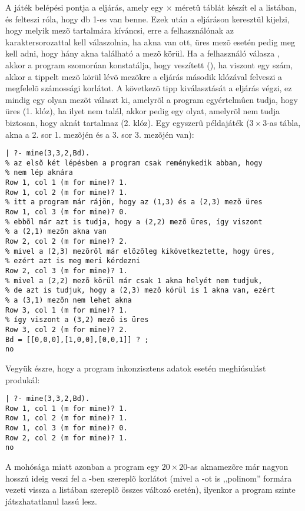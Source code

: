 A játék belépési pontja a  eljárás, amely
egy  $\times$  méretû táblát készít el a 
listában, és felteszi róla, hogy  db 1-es van benne.
Ezek után a  eljáráson keresztül kijelzi, hogy melyik
mezõ tartalmára kíváncsi, erre a felhasználónak az  karaktersorozattal
kell válaszolnia, ha akna van ott, üres mezõ esetén pedig meg kell adni, hogy
hány akna található a mezõ körül. Ha a felhasználó válasza , akkor a
program szomorúan konstatálja, hogy veszített (), ha viszont egy
szám, akkor a tippelt mezõ körül lévõ mezõkre a  eljárás
második klózával felveszi a megfelelõ számossági korlátot. A következõ tipp
kiválasztását a  eljárás végzi, ez mindig egy olyan mezõt
választ ki, amelyrõl a program egyértelmûen tudja, hogy üres (1. klóz), ha ilyet
nem talál, akkor pedig egy olyat, amelyrõl nem tudja biztosan, hogy aknát tartalmaz
(2. klóz). Egy egyszerû példajáték ($3 \times 3$-as tábla, akna a 2. sor 1. mezõjén
és a 3. sor 3. mezõjén van):

\begin{verbatim}
| ?- mine(3,3,2,Bd).
% az elsõ két lépésben a program csak reménykedik abban, hogy
% nem lép aknára
Row 1, col 1 (m for mine)? 1.
Row 1, col 2 (m for mine)? 1.
% itt a program már rájön, hogy az (1,3) és a (2,3) mezõ üres
Row 1, col 3 (m for mine)? 0.
% ebbõl már azt is tudja, hogy a (2,2) mezõ üres, így viszont
% a (2,1) mezõn akna van
Row 2, col 2 (m for mine)? 2.
% mivel a (2,3) mezõrõl már elõzõleg kikövetkeztette, hogy üres,
% ezért azt is meg meri kérdezni
Row 2, col 3 (m for mine)? 1.
% mivel a (2,2) mezõ körül már csak 1 akna helyét nem tudjuk,
% de azt is tudjuk, hogy a (2,3) mezõ körül is 1 akna van, ezért
% a (3,1) mezõn nem lehet akna
Row 3, col 1 (m for mine)? 1.
% így viszont a (3,2) mezõ is üres
Row 3, col 2 (m for mine)? 2.
Bd = [[0,0,0],[1,0,0],[0,0,1]] ? ;
no
\end{verbatim}

Vegyük észre, hogy a program inkonzisztens adatok esetén meghiúsulást produkál:

\begin{verbatim}
| ?- mine(3,3,2,Bd).
Row 1, col 1 (m for mine)? 1.
Row 1, col 2 (m for mine)? 1.
Row 1, col 3 (m for mine)? 0.
Row 2, col 2 (m for mine)? 1.
no
\end{verbatim}

A \clpb mohósága miatt azonban a program egy $20 \times 20$-as aknamezõre már
nagyon hosszú ideig veszi fel a -ben szereplõ 
korlátot (mivel a -ot is ,,polinom'' formára vezeti vissza a listában
szereplõ összes változó esetén), ilyenkor a program szinte játszhatatlanul lassú lesz.